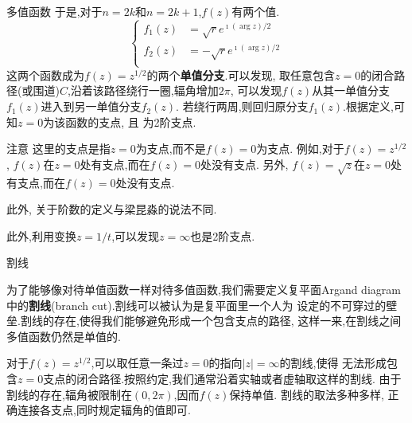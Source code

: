 \documentclass[fontset=windows, chinese, 10pt]{beamer}
\begin{document}
\begin{frame}{多值函数}
于是,对于$n= 2k$和$n=2k+1$,$f(z)$有两个值.
\begin{equation}
    \left\{\begin{aligned}
    f_1(z) & =\sqrt{r}  e^{\imath(\arg z) / 2} \\
    f_2(z) & =-\sqrt{r}  e^{\imath(\arg z) / 2} \\
    \end{aligned}\right.
\end{equation}
这两个函数成为$f(z)= z^{1/2}$的两个\textbf{单值分支}.可以发现,
取任意包含$z=0$的闭合路径(或围道)$C$,沿着该路径绕行一圈,辐角增加$2\pi$,
可以发现$f(z)$从其一单值分支$f_1(z)$进入到另一单值分支$f_2(z)$.
若绕行两周,则回归原分支$f_1(z)$.根据定义,可知$z=0$为该函数的支点, 且
为2阶支点.

\begin{alertblock}{注意}
  \small
    这里的支点是指$z=0$为支点,而不是$f(z)=0$为支点.
    例如,对于$f(z) = z^{1/2}$, $f(z)$在$z=0$处有支点,而在$f(z)=0$处没有支点.
    另外, $f(z) = \sqrt{z}$在$z=0$处有支点,而在$f(z)=0$处没有支点.
    
    此外, 关于阶数的定义与梁昆淼的说法不同.
\end{alertblock}
此外,利用变换$z=1/t$,可以发现$z=\infty$也是2阶支点.

\end{frame}

\begin{frame}{割线}

为了能够像对待单值函数一样对待多值函数,我们需要定义复平面Argand diagram
中的\textbf{割线}(branch cut).割线可以被认为是复平面里一个人为
设定的不可穿过的壁垒.割线的存在,使得我们能够避免形成一个包含支点的路径,
这样一来,在割线之间多值函数仍然是单值的.

对于$f(z)=z^{1/2}$,可以取任意一条过$z=0$的指向$|z|=\infty$的割线,使得
无法形成包含$z=0$支点的闭合路径.按照约定,我们通常沿着实轴或者虚轴取这样的割线.
由于割线的存在,辐角被限制在$(0,2\pi)$,因而$f(z)$保持单值.
割线的取法多种多样, 正确连接各支点,同时规定辐角的值即可.
\end{frame}
\end{document}
